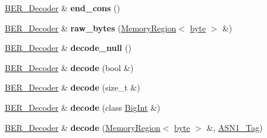 \begin{DoxyCompactItemize}
\item 
\hypertarget{classBotan_1_1BER__Decoder_a8b35266f37d62e9a1da0b5e343a06db6}{\hyperlink{classBotan_1_1BER__Decoder}{B\-E\-R\-\_\-\-Decoder} \& {\bfseries end\-\_\-cons} ()}\label{classBotan_1_1BER__Decoder_a8b35266f37d62e9a1da0b5e343a06db6}

\item 
\hypertarget{classBotan_1_1BER__Decoder_a4d79644a5d8fe5b786f7d0349167b7ef}{\hyperlink{classBotan_1_1BER__Decoder}{B\-E\-R\-\_\-\-Decoder} \& {\bfseries raw\-\_\-bytes} (\hyperlink{classBotan_1_1MemoryRegion}{Memory\-Region}$<$ \hyperlink{namespaceBotan_a7d793989d801281df48c6b19616b8b84}{byte} $>$ \&)}\label{classBotan_1_1BER__Decoder_a4d79644a5d8fe5b786f7d0349167b7ef}

\item 
\hypertarget{classBotan_1_1BER__Decoder_ab442413e33156a08bf4249afd64fc000}{\hyperlink{classBotan_1_1BER__Decoder}{B\-E\-R\-\_\-\-Decoder} \& {\bfseries decode\-\_\-null} ()}\label{classBotan_1_1BER__Decoder_ab442413e33156a08bf4249afd64fc000}

\item 
\hypertarget{classBotan_1_1BER__Decoder_a6b2e58c333d31e19db9d3f3d389e3131}{\hyperlink{classBotan_1_1BER__Decoder}{B\-E\-R\-\_\-\-Decoder} \& {\bfseries decode} (bool \&)}\label{classBotan_1_1BER__Decoder_a6b2e58c333d31e19db9d3f3d389e3131}

\item 
\hypertarget{classBotan_1_1BER__Decoder_a59b7fbb053961aecd3e2d20a970cb4be}{\hyperlink{classBotan_1_1BER__Decoder}{B\-E\-R\-\_\-\-Decoder} \& {\bfseries decode} (size\-\_\-t \&)}\label{classBotan_1_1BER__Decoder_a59b7fbb053961aecd3e2d20a970cb4be}

\item 
\hypertarget{classBotan_1_1BER__Decoder_aae7885a1216dde6cef91b0aae01550ce}{\hyperlink{classBotan_1_1BER__Decoder}{B\-E\-R\-\_\-\-Decoder} \& {\bfseries decode} (class \hyperlink{classBotan_1_1BigInt}{Big\-Int} \&)}\label{classBotan_1_1BER__Decoder_aae7885a1216dde6cef91b0aae01550ce}

\item 
\hypertarget{classBotan_1_1BER__Decoder_a8b296531427667ec33d7d810bca22411}{\hyperlink{classBotan_1_1BER__Decoder}{B\-E\-R\-\_\-\-Decoder} \& {\bfseries decode} (\hyperlink{classBotan_1_1MemoryRegion}{Memory\-Region}$<$ \hyperlink{namespaceBotan_a7d793989d801281df48c6b19616b8b84}{byte} $>$ \&, \hyperlink{namespaceBotan_aaa08f67a945ef195fa39e62659dffa7a}{A\-S\-N1\-\_\-\-Tag})}\label{classBotan_1_1BER__Decoder_a8b296531427667ec33d7d810bca22411}


\end{DoxyCompactItemize}
